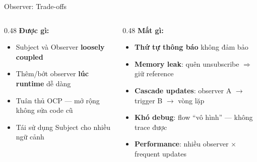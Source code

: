 \begin{frame}{Observer: Trade-offs}
  \begin{columns}[T]
    \begin{column}{0.48\textwidth}
      \textcolor{mygreen}{\textbf{Được gì:}}
      \begin{itemize}
        \item Subject và Observer \textbf{loosely coupled}
        \item Thêm/bớt observer \textbf{lúc runtime} dễ dàng
        \item Tuân thủ OCP --- mở rộng không sửa code cũ
        \item Tái sử dụng Subject cho nhiều ngữ cảnh
      \end{itemize}
    \end{column}
    \begin{column}{0.48\textwidth}
      \textcolor{myred}{\textbf{Mất gì:}}
      \begin{itemize}
        \item \textbf{Thứ tự thông báo} không đảm bảo
        \item \textbf{Memory leak}: quên unsubscribe $\Rightarrow$ giữ reference
        \item \textbf{Cascade updates}: observer A $\rightarrow$ trigger B $\rightarrow$ vòng lặp
        \item \textbf{Khó debug}: flow ``vô hình'' --- không trace được
        \item \textbf{Performance}: nhiều observer $\times$ frequent updates
      \end{itemize}
    \end{column}
  \end{columns}
\end{frame}

